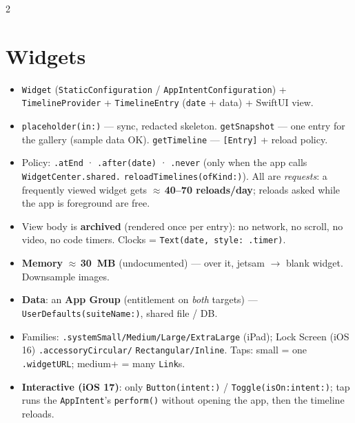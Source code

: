 \documentclass[8pt]{extarticle}
\begin{document}



\begin{multicols}{2}
\raggedright

\section{Widgets}
\begin{itemize}
  \item \texttt{Widget} (\texttt{StaticConfiguration} /
        \texttt{AppIntentConfiguration}) + \texttt{TimelineProvider}
        + \texttt{TimelineEntry} (\texttt{date} + data) + SwiftUI view.
  \item \texttt{placeholder(in:)} — sync, redacted skeleton.
        \texttt{getSnapshot} — one entry for the gallery (sample data OK).
        \texttt{getTimeline} — \texttt{[Entry]} + reload policy.
  \item Policy: \texttt{.atEnd} · \texttt{.after(date)} · \texttt{.never}
        (only when the app calls \texttt{WidgetCenter.shared.}\allowbreak
        \texttt{reloadTimelines(ofKind:)}). All are \emph{requests}: a
        frequently viewed widget gets $\approx$\,\textbf{40--70 reloads/day};
        reloads asked while the app is foreground are free.
  \item View body is \textbf{archived} (rendered once per entry): no
        network, no scroll, no video, no code timers. Clocks =
        \texttt{Text(date, style: .timer)}.
  \item \textbf{Memory} $\approx$\,\textbf{30~MB} (undocumented)\unverified{} — over it,
        jetsam $\to$ blank widget. Downsample images.
  \item \textbf{Data}: an \textbf{App Group} (entitlement on \emph{both}
        targets) — \texttt{UserDefaults(suiteName:)}, shared file / DB.
  \item Families: \texttt{.systemSmall/Medium/Large/}\allowbreak\texttt{ExtraLarge}
        (iPad); Lock Screen (iOS 16) \texttt{.accessoryCircular/}\allowbreak
        \texttt{Rectangular/Inline}. Taps: small = one \texttt{.widgetURL};
        medium+ = many \texttt{Link}s.
  \item \textbf{Interactive (iOS 17)}: only \texttt{Button(intent:)} /
        \texttt{Toggle(isOn:intent:)}; tap runs the \texttt{AppIntent}'s
        \texttt{perform()} without opening the app, then the timeline reloads.
\end{itemize}


\end{multicols}
\end{document}
